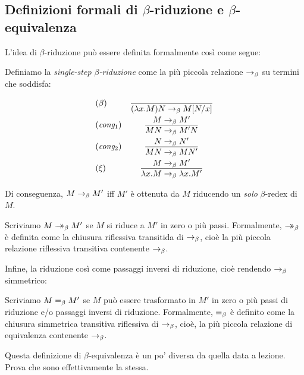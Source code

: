 \documentclass{article}
\begin{document}
\subsection{Definizioni formali di $\beta$-riduzione e $\beta$-equivalenza}

L'idea di $\beta$-riduzione pu\`o essere definita formalmente cos\`i come segue:

\begin{definition}\label{page-def-beta}
  Definiamo la {\em single-step $\beta$-riduzione} come la pi\`u piccola
  relazione $\rightarrow_{\beta}$ su termini che soddisfa:
  \[ \begin{array}{lc}
    \nrule{\beta} &
    \deriv{}{(\lam x.M)N\redb \subst{M}{N}{x}} \nl
    \trule{cong$_1$} &
    \deriv{M\redb M'}{MN\redb M'N} \nl
    \trule{cong$_2$} &
    \deriv{N\redb N'}{MN\redb MN'} \nl
    \nrule{\xi} &
    \deriv{M\redb M'}{\lam x.M\redb \lam x.M'}
  \end{array}
  \]
\end{definition}

Di conseguenza, $M\rightarrow_{\beta} M'$ iff $M'$ \`e ottenuta da $M$ 
riducendo un {\em solo} $\beta$-redex di $M$.

\begin{definition}
  Scriviamo $M\mathrel{\rightarrow\!\!\!\!\!\rightarrow}_{\beta} M'$ se $M$ si riduce a $M'$ in zero o pi\`u passi.
  Formalmente, $\mathrel{\rightarrow\!\!\!\!\!\rightarrow}_{\beta}$ \`e definita come la chiusura riflessiva
transitida di $\rightarrow_{\beta}$, cio\`e la pi\`u piccola relazione riflessiva
transitiva contenente $\rightarrow_{\beta}$.
\end{definition}
  
Infine, la %
riduzione cos\`i come passaggi inversi di riduzione, cio\`e rendendo $\rightarrow_{\beta}$
simmetrico:

\begin{definition}
  Scriviamo $M=_{\beta} M'$ se $M$ pu\`o essere trasformato in $M'$ in zero o pi\`u
  passi di riduzione e/o passaggi inversi di riduzione. Formalmente,
  $=_{\beta}$ \`e definito come la chiusura simmetrica transitiva riflessiva
  di $\rightarrow_{\beta}$, cio\`e, la pi\`u piccola relazione di equivalenza contenente
  $\rightarrow_{\beta}$.
\end{definition}

\begin{exercise}
  Questa definizione di $\beta$-equivalenza \`e un po' diversa da
  quella data a lezione. Prova che sono effettivamente la stessa.
\end{exercise}
\end{document}
